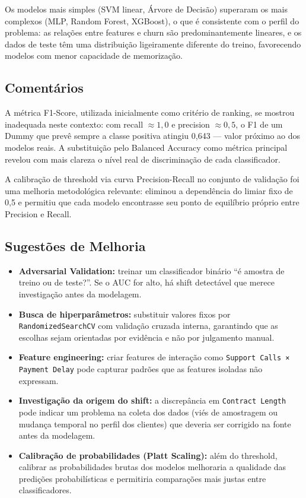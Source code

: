 \documentclass[12pt, a4paper]{article}
\begin{document}
Os modelos mais simples (SVM linear, Árvore de Decisão) superaram os mais complexos
(MLP, Random Forest, XGBoost), o que é consistente com o perfil do problema: as
relações entre features e churn são predominantemente lineares, e os dados de teste
têm uma distribuição ligeiramente diferente do treino, favorecendo modelos com menor
capacidade de memorização.

\subsection{Comentários}

A métrica F1-Score, utilizada inicialmente como critério de ranking, se mostrou
inadequada neste contexto: com recall $\approx 1{,}0$ e precision $\approx 0{,}5$,
o F1 de um Dummy que prevê sempre a classe positiva atingiu 0,643 --- valor próximo
ao dos modelos reais. A substituição pelo Balanced Accuracy como métrica principal
revelou com mais clareza o nível real de discriminação de cada classificador.

A calibração de threshold via curva Precision-Recall no conjunto de validação foi
uma melhoria metodológica relevante: eliminou a dependência do limiar fixo de 0,5
e permitiu que cada modelo encontrasse seu ponto de equilíbrio próprio entre
Precision e Recall.

\subsection{Sugestões de Melhoria}

\begin{itemize}
  \item \textbf{Adversarial Validation:} treinar um classificador binário ``é amostra
        de treino ou de teste?''. Se o AUC for alto, há shift detectável que merece
        investigação antes da modelagem.

  \item \textbf{Busca de hiperparâmetros:} substituir valores fixos por
        \texttt{RandomizedSearchCV} com validação cruzada interna, garantindo que
        as escolhas sejam orientadas por evidência e não por julgamento manual.

  \item \textbf{Feature engineering:} criar features de interação como
        \texttt{Support Calls × Payment Delay} pode capturar padrões que as features
        isoladas não expressam.

  \item \textbf{Investigação da origem do shift:} a discrepância em
        \texttt{Contract Length} pode indicar um problema na coleta dos dados
        (viés de amostragem ou mudança temporal no perfil dos clientes) que
        deveria ser corrigido na fonte antes da modelagem.

  \item \textbf{Calibração de probabilidades (Platt Scaling):} além do threshold,
        calibrar as probabilidades brutas dos modelos melhoraria a qualidade das
        predições probabilísticas e permitiria comparações mais justas entre classificadores.
\end{itemize}
\end{document}
